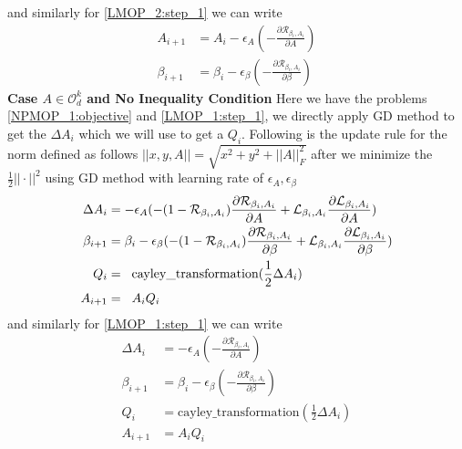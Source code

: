 and similarly for \ref{LMOP_2:step_1} we can write
\begin{equation}
\begin{aligned}
A_{i+1} &= A_{i} - \epsilon_A ( -\frac{\partial \mathcal{R}_{\beta_i, A_i}}{\partial A} )\\
\beta_{i+1} &= \beta_{i} - \epsilon_{\beta} ( -\frac{\partial \mathcal{R}_{\beta_i, A_i}}{\partial \beta} )
\end{aligned}    
\end{equation}
\newline \textbf{Case $A \in \mathcal{O}_d^k$ and No Inequality Condition}
\newline Here we have the problems \ref{NPMOP_1:objective} and \ref{LMOP_1:step_1}, we directly apply GD method to get the $\Delta A_i$ which we will use to get a $Q_i$. Following is the update rule for the norm defined as follows $||x,y,A|| = \sqrt{x^2+y^2+||A||^2_F}$ after we minimize the $\frac{1}{2}||\cdot||^2$ using GD method with learning rate of $\epsilon_A,\epsilon_{\beta}$
\begin{equation}
\begin{aligned}
\Delta A_i &= - \epsilon_A ( -(1-\mathcal{R}_{\beta_i, A_i})\frac{\partial \mathcal{R}_{\beta_i, A_i}}{\partial A} + \mathcal{L}_{\beta_i, A_i} \frac{\partial \mathcal{L}_{\beta_i, A_i}}{\partial A})\\
\beta_{i+1} &= \beta_i - \epsilon_{\beta} ( -(1-\mathcal{R}_{\beta_i, A_i})\frac{\partial \mathcal{R}_{\beta_i, A_i}}{\partial \beta} + \mathcal{L}_{\beta_i, A_i} \frac{\partial \mathcal{L}_{\beta_i, A_i}}{\partial \beta})\\
Q_i &= \hspace{2mm} \text{cayley\_transformation}(\frac{1}{2} \Delta A_i)\\
A_{i+1} &= \hspace{2mm} A_i Q_i \\
\end{aligned}    
\end{equation}
and similarly for \ref{LMOP_1:step_1} we can write
\begin{equation}
\begin{aligned}
\Delta A_{i} &= - \epsilon_A ( -\frac{\partial \mathcal{R}_{\beta_i, A_i}}{\partial A} )\\
\beta_{i+1} &= \beta_i - \epsilon_{\beta} ( -\frac{\partial \mathcal{R}_{\beta_i, A_i}}{\partial \beta} )\\
Q_i &= \text{cayley\_transformation}(\frac{1}{2} \Delta A_i)\\
A_{i+1} &= A_i Q_i
\end{aligned}    
\end{equation}
